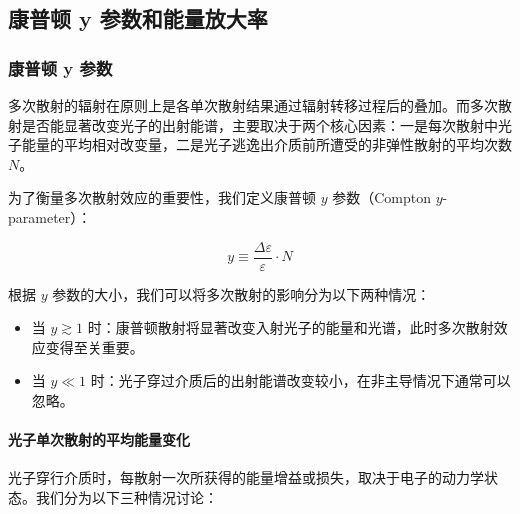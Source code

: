 \subsection{康普顿 y 参数和能量放大率}

\subsubsection{康普顿 y 参数}

多次散射的辐射在原则上是各单次散射结果通过辐射转移过程后的叠加。而多次散射是否能显著改变光子的出射能谱，主要取决于两个核心因素：一是每次散射中光子能量的平均相对改变量，二是光子逃逸出介质前所遭受的非弹性散射的平均次数 $N$。

为了衡量多次散射效应的重要性，我们定义康普顿 $y$ 参数（Compton $y$-parameter）：
\begin{tcolorbox}[colframe=black, colback=white, boxrule=0.5pt, arc=0pt]
\begin{equation}
    y \equiv \frac{\Delta \varepsilon}{\varepsilon} \cdot N
\end{equation}
\end{tcolorbox}

根据 $y$ 参数的大小，我们可以将多次散射的影响分为以下两种情况：
\begin{itemize}
    \item 当 $y \gtrsim 1$ 时：康普顿散射将显著改变入射光子的能量和光谱，此时多次散射效应变得至关重要。
    \item 当 $y \ll 1$ 时：光子穿过介质后的出射能谱改变较小，在非主导情况下通常可以忽略。
\end{itemize}

\paragraph{光子单次散射的平均能量变化}
光子穿行介质时，每散射一次所获得的能量增益或损失，取决于电子的动力学状态。我们分为以下三种情况讨论：


